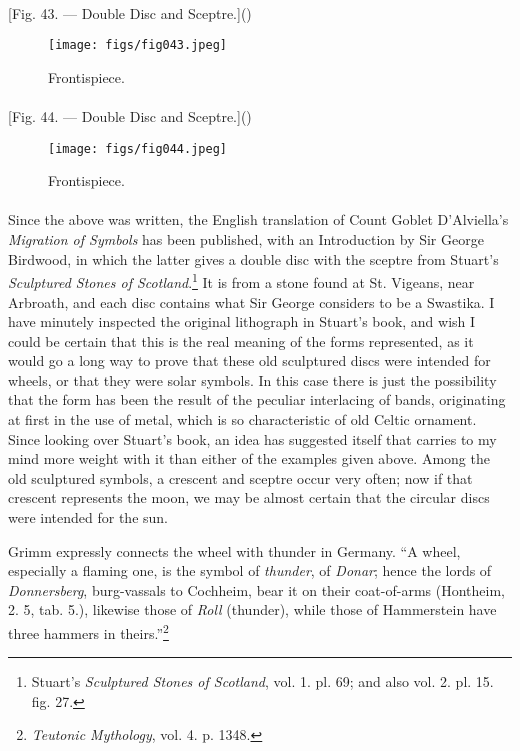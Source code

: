 \documentclass[a4paper, 11pt, oneside, polutonikogreek, english]{article}
\begin{document}
\paragraph{}
[Fig. 43. --- Double Disc and Sceptre.]()
\begin{figure}[H]
\centering
\texttt{[image: figs/fig043.jpeg]}
\caption{Frontispiece.}
\end{figure}
\paragraph{}
[Fig. 44. --- Double Disc and Sceptre.]()
\begin{figure}[H]
\centering
\texttt{[image: figs/fig044.jpeg]}
\caption{Frontispiece.}
\end{figure}
\paragraph{}
Since the above was written, the English translation of Count Goblet D'Alviella's \emph{Migration of Symbols} has been published, with an Introduction by Sir George Birdwood, in which the latter gives a double disc with the sceptre from Stuart's \emph{Sculptured Stones of Scotland}.\footnote{Stuart's \emph{Sculptured Stones of Scotland}, vol. 1. pl. 69; and also vol. 2. pl. 15. fig. 27.} It is from a stone found at St. Vigeans, near Arbroath, and each disc contains what Sir George considers to be a Swastika. I have minutely inspected the original lithograph in Stuart's book, and wish I could be certain that this is the real meaning of the forms represented, as it would go a long way to prove that these old sculptured discs were intended for wheels, or that they were solar symbols. In this case there is just the possibility that the form has been the result of the peculiar interlacing of bands, originating at first in the use of metal, which is so characteristic of old Celtic ornament. Since looking over Stuart's book, an idea has suggested itself that carries to my mind more weight with it than either of the examples given above. Among the old sculptured symbols, a crescent and sceptre occur very often; now if that crescent represents the moon, we may be almost certain that the circular discs were intended for the sun.

Grimm expressly connects the wheel with thunder in Germany. ``A wheel, especially a flaming one, is the symbol of \emph{thunder}, of \emph{Donar}; hence the lords of \emph{Donnersberg}, burg-vassals to Cochheim, bear it on their coat-of-arms (Hontheim, 2. 5, tab. 5.), likewise those of \emph{Roll} (thunder), while those of Hammerstein have three hammers in theirs.''\footnote{\emph{Teutonic Mythology}, vol. 4. p. 1348.}
\end{document}
